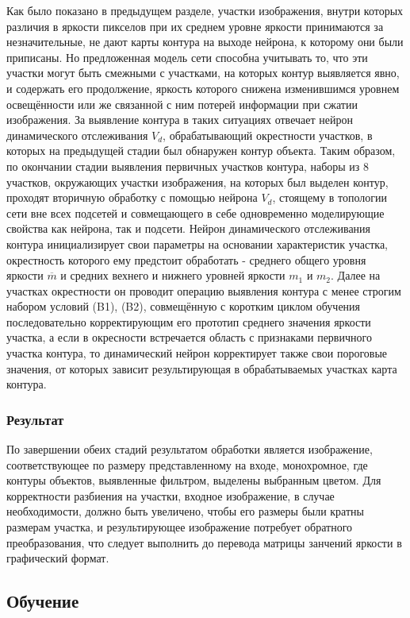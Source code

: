 \documentclass[a4paper,12pt]{report}
\begin{document}
Как было показано в предыдущем разделе, участки изображения, внутри которых различия в яркости пикселов при их среднем уровне яркости принимаются за незначительные, не дают карты контура на выходе нейрона, к которому они были приписаны. Но предложенная модель сети способна учитывать то, что эти участки могут быть смежными с участками, на которых контур выявляется явно, и содержать его продолжение, яркость которого снижена изменившимся уровнем освещённости или же связанной с ним потерей информации при сжатии изображения. За выявление контура в таких ситуациях отвечает нейрон динамического отслеживания $V_d$, обрабатывающий окрестности участков, в которых на предыдущей стадии был обнаружен контур объекта. Таким образом, по окончании стадии выявления первичных участков контура, наборы из 8 участков, окружающих участки изображения, на которых был выделен контур, проходят вторичную обработку с помощью нейрона $V_d$, стоящему в топологии сети вне всех подсетей и совмещающего в себе одновременно моделирующие свойства как нейрона, так и подсети. Нейрон динамического отслеживания контура инициализирует свои параметры на основании характеристик участка, окрестность которого ему предстоит обработать - среднего общего уровня яркости $\overline{m}$ и средних вехнего и нижнего уровней яркости $m_1$ и $m_2$. Далее на участках окрестности он проводит операцию выявления контура с менее строгим набором условий (B1), (B2), совмещённую с коротким циклом обучения последовательно корректирующим его прототип среднего значения яркости участка, а если в окресности встречается область с признаками первичного участка контура, то динамический нейрон корректирует также свои пороговые значения, от которых зависит результирующая в обрабатываемых участках карта контура.

\subsubsection{Результат}

По завершении обеих стадий результатом обработки является изображение, соответствующее по размеру представленному на входе, монохромное, где контуры объектов, выявленные фильтром, выделены выбранным цветом. Для корректности разбиения на участки, входное изображение, в случае необходимости, должно быть увеличено, чтобы его размеры были кратны размерам участка, и результирующее изображение потребует обратного преобразования, что следует выполнить до перевода матрицы занчений яркости в графический формат.

\subsection{Обучение}
\end{document}
